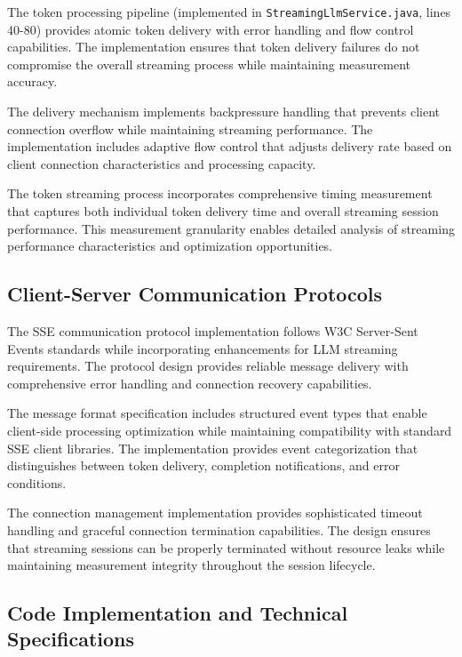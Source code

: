The token processing pipeline (implemented in \texttt{StreamingLlmService.java}, lines 40-80) provides atomic token delivery with error handling and flow control capabilities. The implementation ensures that token delivery failures do not compromise the overall streaming process while maintaining measurement accuracy.


The delivery mechanism implements backpressure handling that prevents client connection overflow while maintaining streaming performance. The implementation includes adaptive flow control that adjusts delivery rate based on client connection characteristics and processing capacity.

The token streaming process incorporates comprehensive timing measurement that captures both individual token delivery time and overall streaming session performance. This measurement granularity enables detailed analysis of streaming performance characteristics and optimization opportunities.

\subsection{Client-Server Communication Protocols}

The SSE communication protocol implementation follows W3C Server-Sent Events standards while incorporating enhancements for LLM streaming requirements. The protocol design provides reliable message delivery with comprehensive error handling and connection recovery capabilities.

The message format specification includes structured event types that enable client-side processing optimization while maintaining compatibility with standard SSE client libraries. The implementation provides event categorization that distinguishes between token delivery, completion notifications, and error conditions.

The connection management implementation provides sophisticated timeout handling and graceful connection termination capabilities. The design ensures that streaming sessions can be properly terminated without resource leaks while maintaining measurement integrity throughout the session lifecycle.

\subsection{Code Implementation and Technical Specifications}

